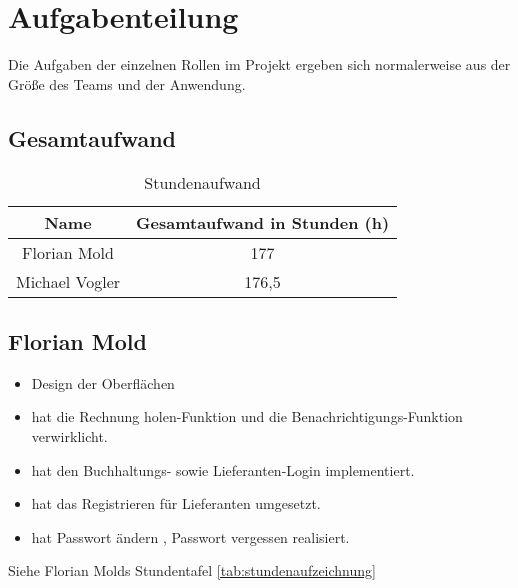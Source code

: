 \section{Aufgabenteilung}
Die Aufgaben der einzelnen Rollen im Projekt ergeben sich normalerweise aus der Größe des Teams und der Anwendung.

\subsection{Gesamtaufwand}
\begin{table}[!h]
\centering
\caption{Stundenaufwand}\label{tab:stunden}
\begin{tabular}{| c | c |}
\hline
Name & Gesamtaufwand in Stunden (h) \\
\hline
Florian Mold & 177 \\ \hline
Michael Vogler & 176,5\\ \hline
\end{tabular}
\end{table}

\subsection{Florian Mold}
\begin{itemize}
\item Design der Oberflächen
\item hat die \glqq Rechnung holen\grqq -Funktion und die \glqq Benachrichtigungs\grqq-Funktion verwirklicht. 
\item hat den Buchhaltungs- sowie Lieferanten-Login implementiert.
\item hat das Registrieren für Lieferanten umgesetzt.
\item hat \glqq Passwort ändern \grqq , \glqq Passwort vergessen\grqq{} realisiert.
\end{itemize}
Siehe Florian Molds Stundentafel \ref{tab:stundenaufzeichnung}

